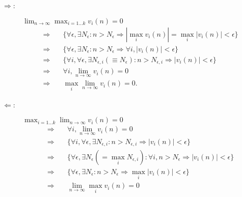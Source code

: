 \begin{description}
  \item[$\Rightarrow$:] $\lim_{n \rightarrow \infty} \max_{i=1 \dots k} v_i(n) = 0$
  \begin{align*}
    \Rightarrow \quad & \{\forall \epsilon, \exists N_\epsilon: n > N_\epsilon \Rightarrow |\max_i v_i(n)| = \max_i |v_i(n)| < \epsilon\} \\
    \Rightarrow \quad & \{\forall \epsilon, \exists N_\epsilon: n > N_\epsilon \Rightarrow \forall i, |v_i(n)| < \epsilon\} \\
    \Rightarrow \quad & \{\forall i, \forall \epsilon, \exists N_{\epsilon, i}(\equiv N_\epsilon): n > N_{\epsilon, i} \Rightarrow |v_i(n)| < \epsilon\} \\
    \Rightarrow \quad & \forall i, \lim_{n \rightarrow \infty} v_i(n) = 0 \\
    \Rightarrow \quad & \max_i \lim_{n \rightarrow \infty} v_i(n) = 0.
  \end{align*}
  \item[$\Leftarrow$:] $\max_{i=1 \dots k} \lim_{n \rightarrow \infty} v_i(n) = 0$
  \begin{align*}
    \Rightarrow \quad & \forall i, \lim_{n \rightarrow \infty} v_i(n) = 0 \\
    \Rightarrow \quad & \{\forall i, \forall \epsilon, \exists N_{\epsilon, i}: n > N_{\epsilon, i} \Rightarrow |v_i(n)| < \epsilon\}\\
    \Rightarrow \quad & \{\forall \epsilon, \exists N_\epsilon (= \max_i N_{\epsilon, i}): \forall i, n > N_\epsilon \Rightarrow |v_i(n)| < \epsilon\}\\
    \Rightarrow \quad & \{\forall \epsilon, \exists N_\epsilon: n > N_\epsilon \Rightarrow \max_i |v_i(n)| < \epsilon\}\\
    \Rightarrow \quad & \lim_{n \rightarrow \infty} \max_i v_i(n) = 0
  \end{align*}
\end{description}
\eproof

